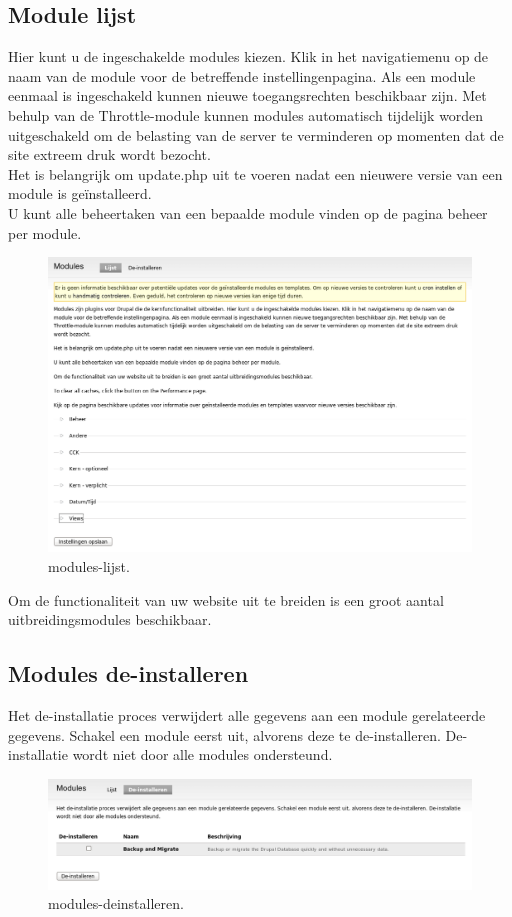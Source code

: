 \subsection{Module lijst}
Hier kunt u de ingeschakelde 
modules kiezen. Klik in het navigatiemenu op de naam van de module voor de betreffende instellingenpagina. 
Als een module eenmaal is ingeschakeld kunnen nieuwe toegangsrechten beschikbaar zijn. 
Met behulp van de Throttle-module  kunnen modules
automatisch tijdelijk worden uitgeschakeld om de belasting van de server te verminderen op momenten dat de site extreem druk wordt bezocht.
\\
Het is belangrijk om update.php uit te voeren nadat een nieuwere versie van een
module is ge\"installeerd.
\\
U kunt alle beheertaken van een bepaalde module vinden op de pagina beheer per module.
\begin{figure}[!h]
    \centering
   \includegraphics[scale=0.3,angle=0]{modules-lijst}
   \caption{modules-lijst.\label{white}}
 \end{figure}
 Om de functionaliteit van uw website uit te breiden is een groot aantal
 uitbreidingsmodules beschikbaar.
 
 
\subsection{Modules de-installeren} 
Het de-installatie proces verwijdert alle gegevens aan een module gerelateerde
gegevens. Schakel een module eerst uit, alvorens deze te de-installeren. De-installatie wordt niet door alle modules ondersteund.
\begin{figure}[!h]
    \centering
   \includegraphics[scale=0.3,angle=0]{modules-deinstalleren}
   \caption{modules-deinstalleren.\label{white}}
 \end{figure}

